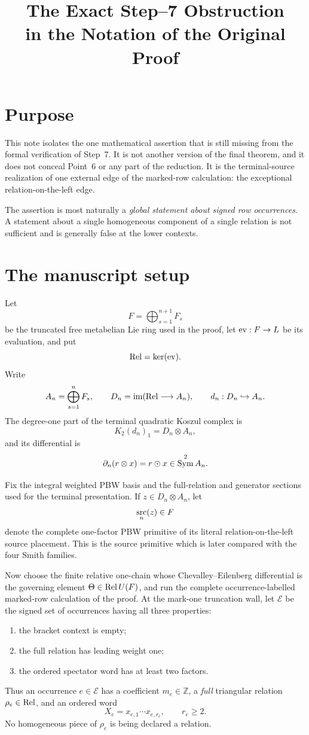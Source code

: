 \documentclass[11pt]{article}
\title{The Exact Step--7 Obstruction\\
  in the Notation of the Original Proof}
\author{}
\date{}
\newcommand{\Z}{\mathbb Z}
\newcommand{\Rel}{\mathop{\rm Rel}}
\newcommand{\Sym}{\mathop{\rm Sym}}
\newcommand{\src}{\mathop{\rm src}}
\newcommand{\ev}{\mathop{\rm ev}}
\begin{document}
\maketitle

\section{Purpose}

This note isolates the one mathematical assertion that is still missing from
the formal verification of Step~7.  It is not another version of the final
theorem, and it does not conceal Point~6 or any part of the reduction.  It is
the terminal-source realization of one external edge of the marked-row
calculation: the exceptional relation-on-the-left edge.

The assertion is most naturally a \emph{global statement about signed row
occurrences}.  A statement about a single homogeneous component of a single
relation is not sufficient and is generally false at the lower contexts.

\section{The manuscript setup}

Let
\[
       F=\bigoplus_{s=1}^{n+1}F_s
\]
be the truncated free metabelian Lie ring used in the proof, let
\(\ev:F\to L\) be its evaluation, and put
\[
       \Rel=\ker(\ev).
\]
Write
\[
 A_n=\bigoplus_{s=1}^{n}F_s,
 \qquad
 D_n=\operatorname{im}(\Rel\longrightarrow A_n),
 \qquad
 d_n:D_n\hookrightarrow A_n.
\]
The degree-one part of the terminal quadratic Koszul complex is
\[
 K_2(d_n)_1=D_n\otimes A_n,
\]
and its differential is
\[
 \partial_n(r\otimes x)=r\odot x\in\Sym^2 A_n.
\]

Fix the integral weighted PBW basis and the full-relation and generator
sections used for the terminal presentation.  If
\(z\in D_n\otimes A_n\), let
\[
       \src_n(z)\in F
\]
denote the complete one-factor PBW primitive of its literal
relation-on-the-left source placement.  This is the source primitive which
is later compared with the four Smith families.

Now choose the finite relative one-chain whose Chevalley--Eilenberg
differential is the governing element \(\Theta\in\Rel U(F)\), and run the
complete occurrence-labelled marked-row calculation of the proof.  At the
mark-one truncation wall, let \(\mathcal E\) be the signed set of occurrences
having all three properties:
\begin{enumerate}
\item the bracket context is empty;
\item the full relation has leading weight one;
\item the ordered spectator word has at least two factors.
\end{enumerate}
Thus an occurrence \(e\in\mathcal E\) has a coefficient
\(m_e\in\Z\), a \emph{full} triangular relation
\(\rho_e\in\Rel\), and an ordered word
\[
       X_e=x_{e,1}\cdots x_{e,r_e},
       \qquad r_e\geq2.
\]
No homogeneous piece of \(\rho_e\) is being declared a relation.
\end{document}
